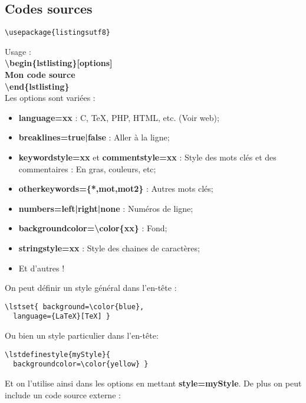         \subsection{Codes sources}
            \begin{lstlisting}
\usepackage{listingsutf8}
            \end{lstlisting}
            Usage :\\
            \colorbox{grisClair}{\textbf{\textbackslash begin\{lstlisting\}[options]\\Mon code source\\\textbackslash end\{lstlisting\}}}\\
            Les options sont variées :
            \begin{itemize}
                \item \textbf{language=xx} : C, TeX, PHP, HTML, etc. (Voir web);
                \item \textbf{breaklines=true|false} : Aller à la ligne;
                \item \textbf{keywordstyle=xx} et \textbf{commentstyle=xx} : Style des mots clés et des commentaires : En gras, couleurs, etc;
                \item \textbf{otherkeywords=\{*,mot,mot2\}} : Autres mots clés;
                \item \textbf{numbers=left|right|none} : Numéros de ligne;
                \item \textbf{backgroundcolor=\textbackslash color\{xx\}} : Fond;
                \item \textbf{stringstyle=xx} : Style des chaines de caractères;
                \item Et d'autres !
            \end{itemize}
            On peut définir un style général dans l'en-tête :
            \begin{lstlisting}
\lstset{ background=\color{blue},
  language={LaTeX}[TeX] }
            \end{lstlisting}
            Ou bien un style particulier dans l'en-tête:
            \begin{lstlisting}
\lstdefinestyle{myStyle}{
  backgroundcolor=\color{yellow} }
            \end{lstlisting}
            Et on l'utilise ainsi dans les options en mettant \textbf{style=myStyle}. De plus on peut include un code source externe :
            \begin{lstlisting}

            \end{lstlisting}
